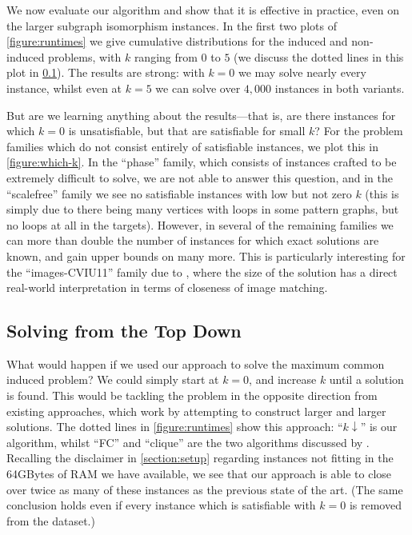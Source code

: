 \documentclass[letterpaper]{article}
\newcommand{\citet}[1]{\citeauthor{#1} \shortcite{#1}}
\theoremstyle{definition}
\begin{document}
We now evaluate our algorithm and show that it is effective in practice, even on the larger subgraph
isomorphism instances. In the first two plots of \cref{figure:runtimes} we give cumulative
distributions for the induced and non-induced problems, with $k$ ranging from $0$ to $5$ (we discuss
the dotted lines in this plot in \cref{section:topdown}). The results are strong: with $k = 0$ we
may solve nearly every instance, whilst even at $k = 5$ we can solve over $4,000$ instances in both
variants.

But are we learning anything about the results---that is, are there instances for which $k = 0$ is
unsatisfiable, but that are satisfiable for small $k$? For the problem families which do not consist
entirely of satisfiable instances, we plot this in \cref{figure:which-k}. In the ``phase'' family,
which consists of instances crafted to be extremely difficult to solve, we are not able to answer
this question, and in the ``scalefree'' family we see no satisfiable instances with low but not zero
$k$ (this is simply due to there being many vertices with loops in some pattern graphs, but no loops
at all in the targets). However, in several of the remaining families we can more than double the
number of instances for which exact solutions are known, and gain upper bounds on many more. This is
particularly interesting for the ``images-CVIU11'' family due to \citet{cviu11}, where the size of
the solution has a direct real-world interpretation in terms of closeness of image matching.

\subsection{Solving from the Top Down}\label{section:topdown}

What would happen if we used our approach to solve the maximum common induced problem? We could
simply start at $k = 0$, and increase $k$ until a solution is found. This would be tackling the
problem in the opposite direction from existing approaches, which work by attempting to construct
larger and larger solutions. The dotted lines in \cref{figure:runtimes} show this approach: ``$k
\downarrow$'' is our algorithm, whilst ``FC'' and ``clique'' are the two algorithms discussed by
\citet{DBLP:conf/cp/McCreeshNPS16}.  Recalling the disclaimer in \cref{section:setup}
regarding instances not fitting in the 64GBytes of RAM we have available, we see that our approach is
able to close over twice as many of these instances as the previous state of the art. (The same
conclusion holds even if every instance which is satisfiable with $k = 0$ is removed from the
dataset.)
\end{document}
